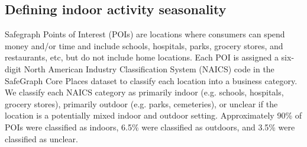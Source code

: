 \documentclass{article}
\begin{document}
\subsection*{Defining indoor activity seasonality}
Safegraph Points of Interest (POIs) are locations where consumers can spend money and/or time and include  schools, hospitals, parks, grocery stores, and restaurants, etc, but do not include home locations. Each POI is assigned a six-digit North American Industry Classification System (NAICS) code in the SafeGraph Core Places dataset to classify each location into a business category. We classify each NAICS category as primarily indoor (e.g. schools, hospitals, grocery stores), primarily outdoor (e.g. parks, cemeteries), or unclear if the location is a potentially mixed indoor and outdoor setting. Approximately 90\% of POIs were classified as indoors, 6.5\% were classified as outdoors, and 3.5\% were classified as unclear.

\end{document}
